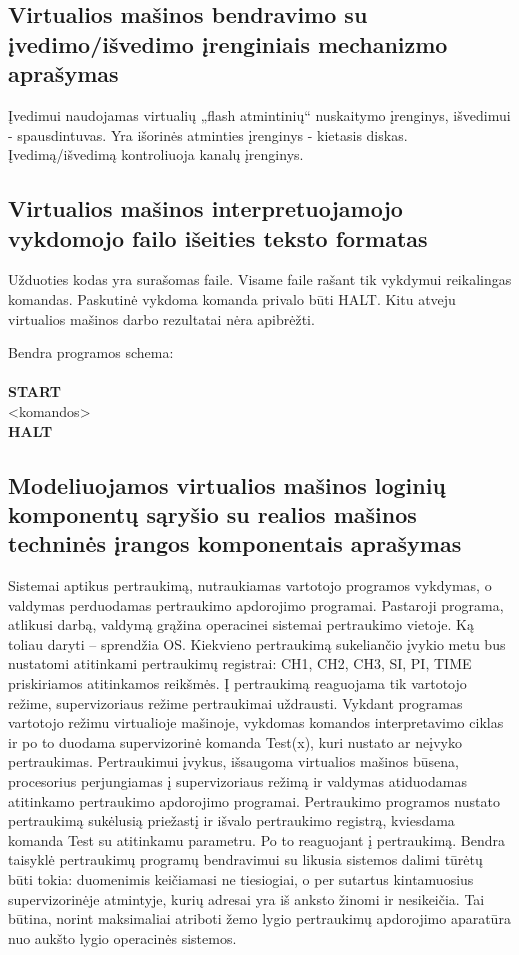 \subsection{Virtualios mašinos bendravimo su įvedimo/išvedimo įrenginiais
mechanizmo aprašymas}

Įvedimui naudojamas virtualių „flash atmintinių“ nuskaitymo įrenginys, išvedimui - spausdintuvas. Yra išorinės atminties įrenginys - kietasis diskas. Įvedimą/išvedimą kontroliuoja kanalų įrenginys.

\subsection{Virtualios mašinos interpretuojamojo vykdomojo failo išeities 
teksto formatas}

Užduoties kodas yra surašomas faile. Visame faile rašant tik vykdymui reikalingas
komandas. Paskutinė vykdoma komanda privalo būti HALT. Kitu atveju virtualios mašinos darbo
rezultatai nėra apibrėžti.

Bendra programos schema:\\
\\\textbf{START}\\
<komandos>\\
\textbf{HALT}

\subsection{Modeliuojamos virtualios mašinos loginių komponentų sąryšio su 
realios mašinos techninės įrangos komponentais aprašymas}

Sistemai aptikus pertraukimą, nutraukiamas vartotojo programos vykdymas, o valdymas perduodamas pertraukimo apdorojimo programai. Pastaroji programa, atlikusi darbą, valdymą grąžina operacinei sistemai pertraukimo vietoje.  Ką toliau daryti – sprendžia OS. Kiekvieno pertraukimą sukeliančio įvykio metu bus nustatomi atitinkami pertraukimų registrai: CH1, CH2, CH3, SI, PI, TIME priskiriamos atitinkamos reikšmės. 
Į pertraukimą reaguojama tik vartotojo režime, supervizoriaus režime pertraukimai uždrausti. Vykdant programas vartotojo režimu virtualioje mašinoje, vykdomas komandos interpretavimo ciklas ir po to duodama supervizorinė komanda Test(x), kuri  nustato ar neįvyko pertraukimas. 
Pertraukimui įvykus, išsaugoma virtualios mašinos būsena, procesorius perjungiamas į supervizoriaus režimą ir valdymas atiduodamas atitinkamo pertraukimo apdorojimo programai.
Pertraukimo programos nustato pertraukimą sukėlusią priežastį ir išvalo pertraukimo registrą, kviesdama komanda Test su atitinkamu parametru. Po  to reaguojant į pertraukimą.
Bendra taisyklė pertraukimų programų bendravimui su likusia sistemos dalimi tūrėtų būti tokia: duomenimis keičiamasi ne tiesiogiai, o per sutartus kintamuosius supervizorinėje atmintyje, kurių adresai yra iš anksto žinomi ir nesikeičia. Tai būtina, norint maksimaliai atriboti žemo lygio pertraukimų apdorojimo aparatūra nuo aukšto lygio operacinės sistemos.
   

